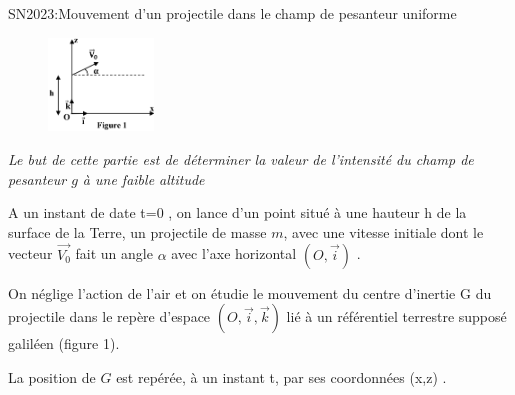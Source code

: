 \documentclass[12pt]{article}
\begin{document}
 \begin{Box2}{SN2023:Mouvement d’un projectile dans le champ de pesanteur uniforme}


  \begin{figure}
  \begin{center}
	\includegraphics[width=0.25\textwidth]{./img/chute_libre.png}
  \end{center}
\end{figure}


   \emph{Le but de cette partie est de déterminer la valeur de l’intensité du champ de pesanteur
   $g$ à une faible altitude}
   
   A un instant de date
t=0 , on lance d’un point situé à une hauteur h de la surface de la Terre, un projectile de
masse $m$, avec une vitesse initiale dont le vecteur $\vec{V_0}$ fait un angle $\alpha$
avec l’axe horizontal $(O,\vec{i})$ .

On néglige l’action de l’air et on étudie le mouvement du centre
d’inertie G du projectile dans le repère d’espace $(O, \vec{i}, \vec{k})$
lié à un référentiel terrestre supposé galiléen (figure 1).

La position de $G$ est repérée, à un instant t, par ses coordonnées (x,z) .


\end{Box2}
\end{document}
